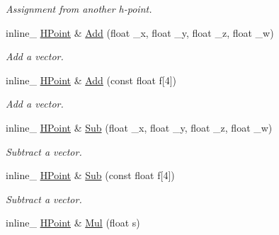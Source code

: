 \begin{DoxyCompactItemize}
\begin{DoxyCompactList}\small\item\em Assignment from another h-\/point. \end{DoxyCompactList}\item 
\hypertarget{class_h_point_a33767b385428491a53b0cd86f7671ee1}{inline\+\_\+ \hyperlink{class_h_point}{H\+Point} \& \hyperlink{class_h_point_a33767b385428491a53b0cd86f7671ee1}{Add} (float \+\_\+x, float \+\_\+y, float \+\_\+z, float \+\_\+w)}\label{class_h_point_a33767b385428491a53b0cd86f7671ee1}

\begin{DoxyCompactList}\small\item\em Add a vector. \end{DoxyCompactList}\item 
\hypertarget{class_h_point_ac98c43aed4f928ba5393985b47b31630}{inline\+\_\+ \hyperlink{class_h_point}{H\+Point} \& \hyperlink{class_h_point_ac98c43aed4f928ba5393985b47b31630}{Add} (const float f\mbox{[}4\mbox{]})}\label{class_h_point_ac98c43aed4f928ba5393985b47b31630}

\begin{DoxyCompactList}\small\item\em Add a vector. \end{DoxyCompactList}\item 
\hypertarget{class_h_point_ac99006202ea5b04f84abc1b8875ad0d9}{inline\+\_\+ \hyperlink{class_h_point}{H\+Point} \& \hyperlink{class_h_point_ac99006202ea5b04f84abc1b8875ad0d9}{Sub} (float \+\_\+x, float \+\_\+y, float \+\_\+z, float \+\_\+w)}\label{class_h_point_ac99006202ea5b04f84abc1b8875ad0d9}

\begin{DoxyCompactList}\small\item\em Subtract a vector. \end{DoxyCompactList}\item 
\hypertarget{class_h_point_a0cebe5d5bf5e39c04f04863e0b902a91}{inline\+\_\+ \hyperlink{class_h_point}{H\+Point} \& \hyperlink{class_h_point_a0cebe5d5bf5e39c04f04863e0b902a91}{Sub} (const float f\mbox{[}4\mbox{]})}\label{class_h_point_a0cebe5d5bf5e39c04f04863e0b902a91}

\begin{DoxyCompactList}\small\item\em Subtract a vector. \end{DoxyCompactList}\item 
\hypertarget{class_h_point_ab94bdf382bf9166c872f7b06993ec13b}{inline\+\_\+ \hyperlink{class_h_point}{H\+Point} \& \hyperlink{class_h_point_ab94bdf382bf9166c872f7b06993ec13b}{Mul} (float s)}\label{class_h_point_ab94bdf382bf9166c872f7b06993ec13b}


\end{DoxyCompactItemize}
